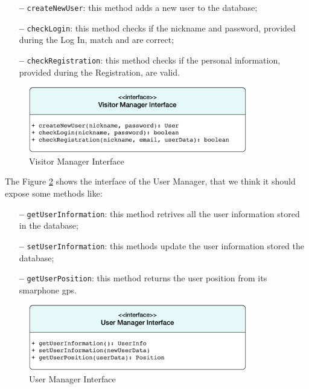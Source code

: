 \begin{itemize}
\item[\textbf{--}] \texttt{createNewUser}: this method adds a new user to the database;
\item[\textbf{--}] \texttt{checkLogin}: this method checks if the nickname and password, provided during the Log In, match and are correct;
\item[\textbf{--}] \texttt{checkRegistration}: this method checks if the personal information, provided during the Registration, are valid.
\end{itemize}

\begin{figure}[htbp]
\centering
\vspace{52pt}
\includegraphics[width=0.85\textwidth]{Images/VisitorManager.pdf}
\vspace{10pt}
\caption{Visitor Manager Interface}
\label{fig:visitor}
\end{figure}
\clearpage

\newline
The Figure \ref{fig:user} shows the interface of the User Manager, that we think it should expose some methods like:

\begin{itemize}
\item[\textbf{--}] \texttt{getUserInformation}: this method retrives all the user information stored in the database;
\item[\textbf{--}] \texttt{setUserInformation}: this methods update the user  information stored the database;
\item[\textbf{--}] \texttt{getUserPosition}: this method returns the user position from its smarphone \acs{gps}.
\end{itemize}

\begin{figure}[htbp]
\centering
\vspace{72pt}
\includegraphics[width=0.85\textwidth]{Images/UserManager.pdf}
\vspace{10pt}
\caption{User Manager Interface}
\label{fig:user}
\end{figure}
\clearpage

